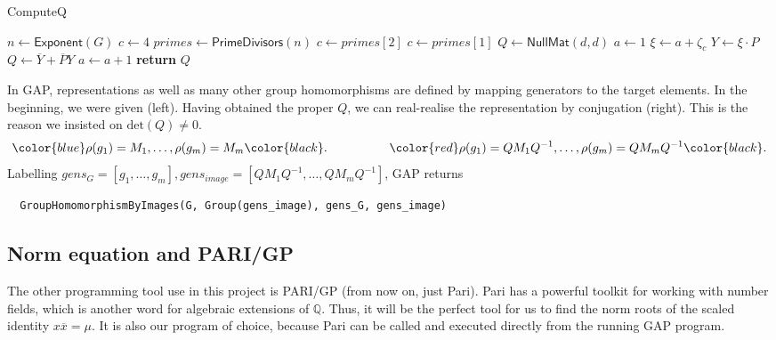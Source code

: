 \documentclass[11pt]{article}
\begin{document}
\begin{algorithm}
  \caption{ComputeQ}
  \label{alg:comp_q}
  \begin{algorithmic}
    \State $n \gets \textsf{Exponent}(G)$
      \State $c \gets 4$
    \Else
      \State $primes \gets \textsf{PrimeDivisors}(n)$
        \State $c \gets primes[2]$
      \Else
        \State $c \gets primes[1]$
      \EndIf
    \EndIf
    \State $Q \gets \textsf{NullMat}(d, d)$
    \State $a \gets 1$
      \State $\xi \gets a + \zeta_c$
      \State $Y \gets \xi \cdot P$
      \State $Q \gets \overline{Y} + \overline{P}Y$
      \State $a \gets a+1$
    \EndWhile
    \State \textbf{return} $Q$\
  \end{algorithmic}
\end{algorithm}

In GAP, representations as well as many other group homomorphisms are defined by mapping generators
to the target elements. In the beginning, we were given (\color{blue}left\color{black}). Having obtained the proper $Q$, we
can real-realise the representation by conjugation (\color{red}right\color{black}). This is the reason we insisted on $\text{det}(Q) \neq 0$.
\setstretch{1.6}
\[\color{blue}\rho(g_1) = M_1, \ldots, \rho(g_m) = M_m\color{black}.~~~~~~~~~~~~~~~\color{red}\rho(g_1) = QM_1Q^{-1}, \ldots, \rho(g_m) = QM_mQ^{-1}\color{black}.\]
\doublespacing
Labelling $gens_G = \left[g_1,\ldots,g_m\right], gens_{image} = \left[QM_1Q^{-1}, \ldots, QM_mQ^{-1}\right]$, GAP returns
\begin{verbatim}
  GroupHomomorphismByImages(G, Group(gens_image), gens_G, gens_image)
\end{verbatim}
\newpage
\subsection{Norm equation and PARI/GP} \label{sec:pari}

The other programming tool use in this project is PARI/GP \cite{PARI2}
(from now on, just Pari). Pari has a powerful toolkit for working with number
fields, which is another word for algebraic extensions of $\mathbb{Q}$. Thus, it
will be the perfect tool for us to find the norm roots of the scaled identity
$x\overline{x}=\mu$. It is also our program of choice, because Pari can be called
and executed directly from the running GAP program.
\end{document}
